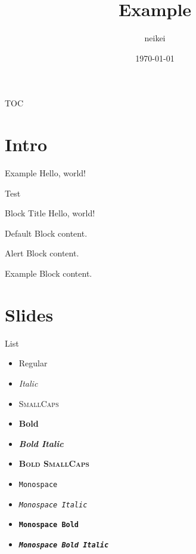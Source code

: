 \documentclass{beamer}
\title{Example}
\date{\today}
\author{neikei}
\institute{TechMeetup}
\begin{document}
\maketitle

    \begin{frame}{TOC}
        \tableofcontents
    \end{frame}

\section{Intro}

    \begin{frame}{Example}
        Hello, world!
    \end{frame}

    \begin{frame}{Test}    
        \begin{alertblock}{Block Title}
        Hello, world!
        \end{alertblock}

        \begin{block}{Default}
            Block content.
        \end{block}

        \begin{alertblock}{Alert}
            Block content.
        \end{alertblock}

        \begin{exampleblock}{Example}
            Block content.
        \end{exampleblock}

    \end{frame}

\section{Slides}

    \begin{frame}{List}
        \begin{itemize}
            \item Regular
            \item \textit{Italic}
            \item \textsc{SmallCaps}
            \item \textbf{Bold}
            \item \textbf{\textit{Bold Italic}}
            \item \textbf{\textsc{Bold SmallCaps}}
            \item \texttt{Monospace}
            \item \texttt{\textit{Monospace Italic}}
            \item \texttt{\textbf{Monospace Bold}}
            \item \texttt{\textbf{\textit{Monospace Bold Italic}}}
        \end{itemize}
    \end{frame}
\end{document}
